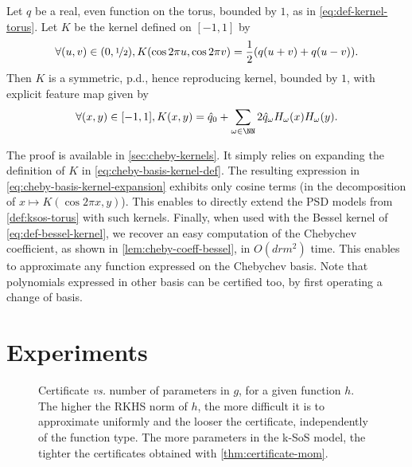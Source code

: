 \documentclass{article}
\begin{document}
\begin{proposition}\label{prop:kernel-cheby-basis}
  Let $q$ be a real, even function on the torus, bounded by $1$, as in \cref{eq:def-kernel-torus}. Let $K$ be the kernel defined on $[-1, 1]$ by
  \begin{equation}\label{eq:cheby-basis-kernel-def}
    \forall (u, v) \in (0, \nicefrac12), K(\cos 2\pi u, \cos 2\pi v) = \frac{1}{2}(q(u + v) + q(u - v)).
  \end{equation}
  Then $K$ is a symmetric, p.d., hence reproducing kernel, bounded by $1$, with explicit feature map given by
  \begin{equation}\label{eq:cheby-basis-kernel-expansion}
    \forall (x, y) \in [-1, 1], K(x, y) = \hat{q}_0 + \sum_{\omega \in \NN} 2\hat{q}_\omega H_\omega(x) H_\omega(y).
  \end{equation}
\end{proposition}

The proof is available in \cref{sec:cheby-kernels}. It simply relies on expanding the definition of $K$ in \cref{eq:cheby-basis-kernel-def}. The resulting expression in \cref{eq:cheby-basis-kernel-expansion} exhibits only cosine terms (in the decomposition of $x \mapsto K(\cos 2\pi x, y)$). This enables to directly extend the PSD models from \cref{def:ksos-torus} with such kernels.
Finally, when used with the Bessel kernel of \cref{eq:def-bessel-kernel}, we recover an easy computation of the Chebychev coefficient, as shown in \cref{lem:cheby-coeff-bessel}, in $O(d r m^2)$ time. This enables to approximate any function expressed on the Chebychev basis. Note that polynomials expressed in other basis can be certified too, by first operating a change of basis.

\section{Experiments}\label{sec:xps}

\begin{figure}
  \centering
  
  \vspace{-.5cm}
  \caption{Certificate \emph{vs.} number of parameters in $g$, for a given function $h$. The higher the RKHS norm of $h$, the more difficult it is to approximate uniformly and the looser the certificate, independently of the function type. The more parameters in the k-SoS model, the tighter the certificates obtained with \cref{thm:certificate-mom}.}
  \label{fig:xp-params-all}
  \vspace{-1cm}
\end{figure}
\end{document}
